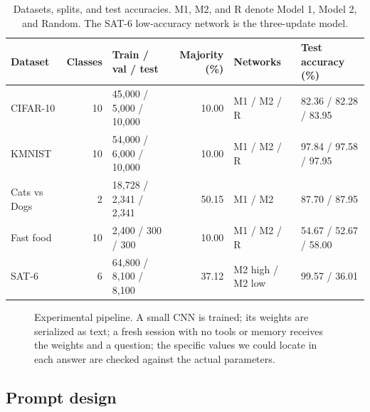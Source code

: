 \documentclass[11pt]{article}
\begin{document}
\begin{table}[t]
  \centering
  \caption{Datasets, splits, and test accuracies. M1, M2, and R denote Model 1, Model 2, and Random. The SAT-6 low-accuracy network is the three-update model.}
  \label{tab:datasets}
  \small
  \setlength{\tabcolsep}{4pt}
  \begin{tabular}{@{}lrlrll@{}}
    \toprule
    Dataset & Classes & Train / val / test & Majority (\%) & Networks & Test accuracy (\%) \\
    \midrule
    CIFAR-10 & 10 & 45,000 / 5,000 / 10,000 & 10.00 & M1 / M2 / R & 82.36 / 82.28 / 83.95 \\
    KMNIST & 10 & 54,000 / 6,000 / 10,000 & 10.00 & M1 / M2 / R & 97.84 / 97.58 / 97.95 \\
    Cats vs Dogs & 2 & 18,728 / 2,341 / 2,341 & 50.15 & M1 / M2 & 87.70 / 87.95 \\
    Fast food & 10 & 2,400 / 300 / 300 & 10.00 & M1 / M2 / R & 54.67 / 52.67 / 58.00 \\
    SAT-6 & 6 & 64,800 / 8,100 / 8,100 & 37.12 & M2 high / M2 low & 99.57 / 36.01 \\
    \bottomrule
  \end{tabular}
\end{table}

\begin{figure}[t]
  \centering
  \caption{Experimental pipeline. A small CNN is trained; its weights are serialized as text; a fresh session with no tools or memory receives the weights and a question; the specific values we could locate in each answer are checked against the actual parameters.}
  \label{fig:pipeline}
\end{figure}

\subsection{Prompt design}
\end{document}
